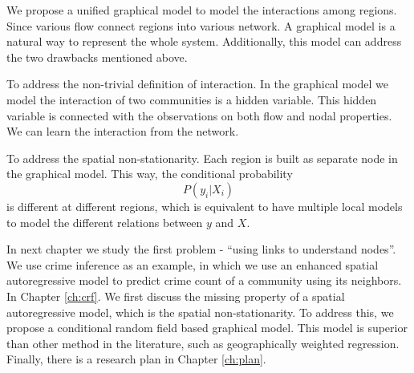 We propose a unified graphical model to model the interactions among regions. Since various flow connect regions into various network. A graphical model is a natural way to represent the whole system. Additionally, this model can address the two drawbacks mentioned above.

To address the non-trivial definition of interaction. In the graphical model we model the interaction of two communities is a hidden variable. This hidden variable is connected with the observations on both flow and nodal properties. We can learn the interaction from the network.

To address the spatial non-stationarity. Each region is built as separate node in the graphical model. This way, the conditional probability 
\[ P(y_i | X_i) \]
is different at different regions, which is equivalent to have multiple local models to model the different relations between $y$ and $X$.





In next chapter we study the first problem - ``using links to understand nodes''. We use crime inference as an example, in which we use an enhanced spatial autoregressive model to predict crime count of a community using its neighbors. In Chapter \ref{ch:crf}. We first discuss the missing property of a spatial autoregressive model, which is the spatial non-stationarity. To address this, we propose a conditional random field based  graphical model. This model is superior than other method in the literature, such as geographically weighted regression. Finally, there is a research plan in Chapter \ref{ch:plan}.



